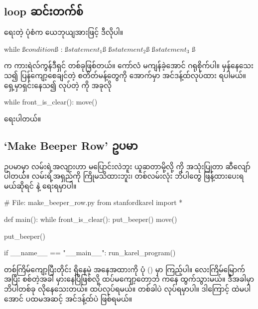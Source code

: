 \subsection*{ loop ဆင်းတက်စ်}
  ရေးတဲ့ ပုံစံက ယေဘုယျအားဖြင့် ဒီလိုပါ။ 
%
\begin{py}
while ß$condition$ß :
    ß$statement_1$ß
    ß$statement_2$ß
    ß$statement_3$ ß
\end{py}
%
 က ကားရဲလ်ကွန်ဒီရှင် တစ်ခုဖြစ်တယ်။ ကော်လံ \fCode{:} မကျန်ခဲ့အောင် ဂရုစိုက်ပါ။  မှန်နေသေးသ၍ ပြန်ကျော့စေချင်တဲ့ စတိတ်မန့်တွေကို  အောက်မှာ အင်ဒန့်ထ်လုပ်ထား ရပါမယ်။ ရှေ့မှာရှင်းနေသ၍  လုပ်တဲ့   ကို အခုလို
%
\begin{py}
while front_is_clear():
    move()
\end{py}
%
ရေးပါတယ်။

\subsection*{‘Make Beeper Row’ ဥပမာ}
 ဥပမာမှာ လမ်းရဲ့အလျားဟာ မပြောင်းလဲဘူး ယူဆတာမို့လို့    ကို အသုံးပြုတာ ဆီလျော်ပါတယ်။ လမ်းရဲ့အရှည်ကို ကြိုမသိထားဘူး၊ တစ်လမ်းလုံး ဘိပါတွေ ဖြန့်ထားပေးရမယ်ဆိုရင်  နဲ့ ရေးရမှာပါ။
%
\begin{py}
# File: make_beeper_row.py
from stanfordkarel import *


def main():
    while front_is_clear():
        put_beeper()
        move()

    put_beeper()


if __name__ == "__main__":
    run_karel_program()

\end{py}
%

တစ်ကြိမ်ကျော့ပြီးတိုင်း  ရှိနေမဲ့ အနေအထားကို ပုံ (\fRefNo{\ref{fig:mbr_iters}}) မှာ ကြည့်ပါ။ လေးကြိမ်မြောက်အပြီး  စစ်တဲ့အခါ မှားနေပြီဖြစ်လို့ ထပ်မကျော့တော့ဘဲ  ကနေ ထွက်သွားမယ်။ ဒီအခါမှာ ဘိပါတစ်ခု လိုနေသေးတယ်။  ထပ်လုပ်ရမယ်။ တစ်ခါပဲ လုပ်ရမှာပါ။ ဒါကြောင့်   ထဲမပါအောင် ပထမအဆင့် အင်ဒန့်ထ်ပဲ ဖြစ်ရမယ်။ 


